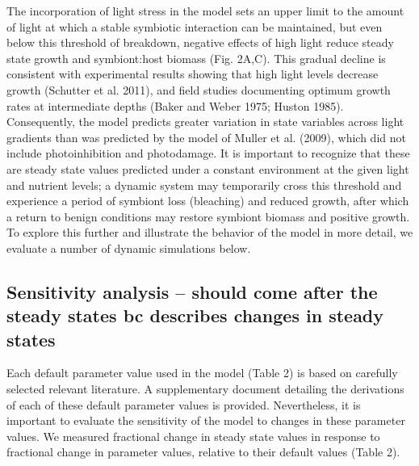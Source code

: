 \documentclass[]{elsarticle} %
\begin{document}
The incorporation of light stress in the model sets an upper limit to
the amount of light at which a stable symbiotic interaction can be
maintained, but even below this threshold of breakdown, negative effects
of high light reduce steady state growth and symbiont:host biomass (Fig.
2A,C). This gradual decline is consistent with experimental results
showing that high light levels decrease growth (Schutter et al. 2011),
and field studies documenting optimum growth rates at intermediate
depths (Baker and Weber 1975; Huston 1985). Consequently, the model
predicts greater variation in state variables across light gradients
than was predicted by the model of Muller et al. (2009), which did not
include photoinhibition and photodamage. It is important to recognize
that these are steady state values predicted under a constant
environment at the given light and nutrient levels; a dynamic system may
temporarily cross this threshold and experience a period of symbiont
loss (bleaching) and reduced growth, after which a return to benign
conditions may restore symbiont biomass and positive growth. To explore
this further and illustrate the behavior of the model in more detail, we
evaluate a number of dynamic simulations below.

\subsection{Sensitivity analysis -- should come after the steady states
bc describes changes in steady
states}\label{sensitivity-analysis-should-come-after-the-steady-states-bc-describes-changes-in-steady-states}

Each default parameter value used in the model (Table 2) is based on
carefully selected relevant literature. A supplementary document
detailing the derivations of each of these default parameter values is
provided. Nevertheless, it is important to evaluate the sensitivity of
the model to changes in these parameter values. We measured fractional
change in steady state values in response to fractional change in
parameter values, relative to their default values (Table 2).
\end{document}
